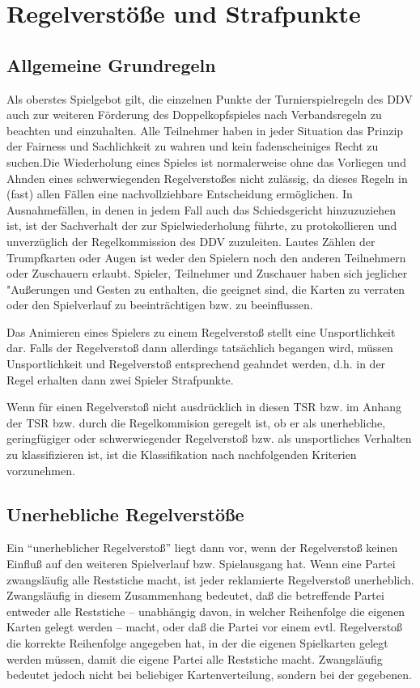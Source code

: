 \documentclass[12pt]{scrartcl}
\begin{document}
\section{Regelverstöße und Strafpunkte}

\subsection{Allgemeine Grundregeln}
Als oberstes Spielgebot gilt, die einzelnen Punkte der
Turnierspielregeln des DDV auch zur weiteren Förderung des
Doppelkopfspieles nach Verbandsregeln zu beachten und einzuhalten.
Alle Teilnehmer haben in jeder Situation das Prinzip der Fairness
und Sachlichkeit zu wahren und kein fadenscheiniges Recht zu
suchen.Die Wiederholung eines Spieles ist normalerweise ohne das
Vorliegen und Ahnden eines schwerwiegenden Regelverstoßes nicht
zulässig, da dieses Regeln in (fast) allen Fällen eine
nachvollziehbare Entscheidung ermöglichen. In Ausnahmefällen,
in denen in jedem Fall auch das Schiedsgericht hinzuzuziehen ist,
ist der Sachverhalt der zur Spielwiederholung führte, zu
protokollieren und unverzüglich der Regelkommission des DDV
zuzuleiten. Lautes Zählen der Trumpfkarten oder Augen ist weder
den Spielern noch den anderen Teilnehmern oder Zuschauern erlaubt.
Spieler, Teilnehmer und Zuschauer haben sich jeglicher
"Außerungen und Gesten zu enthalten, die geeignet sind, die
Karten zu verraten oder den Spielverlauf zu beeinträchtigen bzw.
zu beeinflussen.

Das Animieren eines Spielers zu einem Regelverstoß stellt eine
Unsportlichkeit dar. Falls der Regelverstoß dann allerdings
tatsächlich begangen wird, müssen Unsportlichkeit und
Regelverstoß entsprechend geahndet werden, d.h. in der Regel
erhalten dann zwei Spieler Strafpunkte.

Wenn für einen Regelverstoß nicht ausdrücklich in diesen TSR
bzw. im Anhang der TSR bzw. durch die Regelkommision geregelt
ist, ob er als unerhebliche, geringfügiger oder schwerwiegender
Regelverstoß bzw. als unsportliches Verhalten zu klassifizieren
ist, ist die Klassifikation nach nachfolgenden Kriterien
vorzunehmen.

\subsection{Unerhebliche Regelverstöße}
Ein "`unerheblicher Regelverstoß"' liegt dann vor, wenn der
Regelverstoß keinen Einfluß auf den weiteren Spielverlauf bzw.
Spielausgang hat. Wenn eine Partei zwangsläufig alle Reststiche
macht, ist jeder reklamierte Regelverstoß unerheblich.
Zwangsläufig in diesem Zusammenhang bedeutet, daß die
betreffende Partei entweder alle Reststiche -- unabhängig davon,
in welcher Reihenfolge die eigenen Karten gelegt werden -- macht,
oder daß die Partei vor einem evtl. Regelverstoß die korrekte
Reihenfolge angegeben hat, in der die eigenen Spielkarten gelegt
werden müssen, damit die eigene Partei alle Reststiche macht.
Zwangsläufig bedeutet jedoch nicht bei beliebiger
Kartenverteilung, sondern bei der gegebenen.
\end{document}
